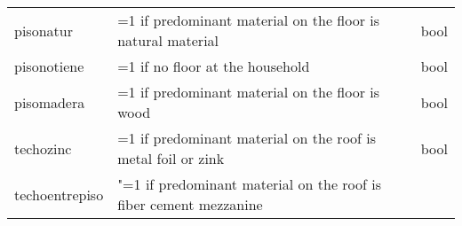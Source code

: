 \documentclass[11pt]{article}
\begin{document}
\begin{longtable}[]{@{}lll@{}}
\begin{minipage}[t]{0.19\columnwidth}
pisonatur\strut
\end{minipage} & \begin{minipage}[t]{0.16\columnwidth}\raggedright\strut
=1 if predominant material on the floor is natural material\strut
\end{minipage} & \begin{minipage}[t]{0.24\columnwidth}\raggedright\strut
bool\strut
\end{minipage}\tabularnewline
\begin{minipage}[t]{0.19\columnwidth}\raggedright\strut
pisonotiene\strut
\end{minipage} & \begin{minipage}[t]{0.16\columnwidth}\raggedright\strut
=1 if no floor at the household\strut
\end{minipage} & \begin{minipage}[t]{0.24\columnwidth}\raggedright\strut
bool\strut
\end{minipage}\tabularnewline
\begin{minipage}[t]{0.19\columnwidth}\raggedright\strut
pisomadera\strut
\end{minipage} & \begin{minipage}[t]{0.16\columnwidth}\raggedright\strut
=1 if predominant material on the floor is wood\strut
\end{minipage} & \begin{minipage}[t]{0.24\columnwidth}\raggedright\strut
bool\strut
\end{minipage}\tabularnewline
\begin{minipage}[t]{0.19\columnwidth}\raggedright\strut
techozinc\strut
\end{minipage} & \begin{minipage}[t]{0.16\columnwidth}\raggedright\strut
=1 if predominant material on the roof is metal foil or zink\strut
\end{minipage} & \begin{minipage}[t]{0.24\columnwidth}\raggedright\strut
bool\strut
\end{minipage}\tabularnewline
\begin{minipage}[t]{0.19\columnwidth}\raggedright\strut
techoentrepiso\strut
\end{minipage} & \begin{minipage}[t]{0.16\columnwidth}\raggedright\strut
"=1 if predominant material on the roof is fiber cement mezzanine\strut
\end{minipage} & \begin{minipage}[t]{0.24\columnwidth}\raggedright\strut

\end{minipage}
\end{longtable}
\end{document}
